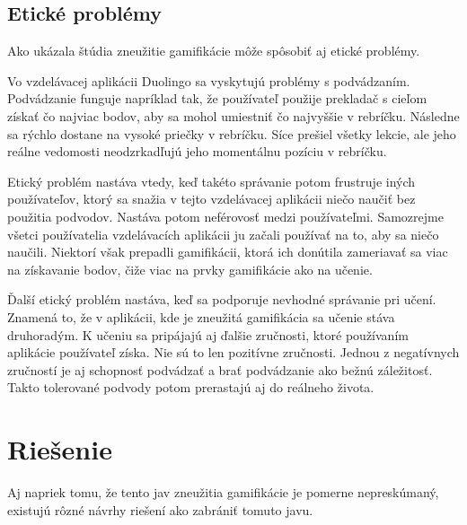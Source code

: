 \documentclass[10pt,twoside,slovak,a4paper]{article}
\begin{document}

\subsection{Etické problémy} \label{Vplyv:Etické problémy}

Ako ukázala štúdia\cite{HadiMogavi2022} zneužitie gamifikácie môže spôsobiť aj etické problémy.

Vo vzdelávacej aplikácii Duolingo sa vyskytujú problémy s podvádzaním. Podvádzanie funguje napríklad tak, že používateľ použije prekladač s cieľom získať čo najviac bodov, aby sa mohol umiestniť čo najvyššie v rebríčku.
Následne sa rýchlo dostane na vysoké priečky v rebríčku. Síce prešiel všetky lekcie, ale jeho reálne vedomosti neodzrkadľujú jeho momentálnu pozíciu v rebríčku.

Etický problém nastáva vtedy, keď takéto správanie potom frustruje iných používateľov, ktorý sa snažia v tejto vzdelávacej aplikácii niečo naučiť bez použitia podvodov. Nastáva potom neférovosť medzi používateľmi.
Samozrejme všetci používatelia vzdelávacích aplikácii ju začali používať na to, aby sa niečo naučili. Niektorí však prepadli gamifikácii, ktorá ich donútila zameriavať sa viac na získavanie bodov, čiže viac na prvky gamifikácie ako na učenie.

Ďalší etický problém nastáva, keď sa podporuje nevhodné správanie pri učení. Znamená to, že v aplikácii, kde je zneužitá gamifikácia sa učenie stáva druhoradým. K učeniu sa pripájajú aj ďalšie zručnosti, ktoré používaním aplikácie používateľ získa. Nie sú to len pozitívne zručnosti. Jednou z negatívnych zručností je aj schopnosť podvádzať a brať podvádzanie ako bežnú záležitosť. Takto tolerované podvody potom prerastajú aj do reálneho života.












\section{Riešenie} \label{Riešenie}
Aj napriek tomu, že tento jav zneužitia gamifikácie je pomerne nepreskúmaný, existujú rôzné návrhy riešení ako zabrániť tomuto javu.
\end{document}
